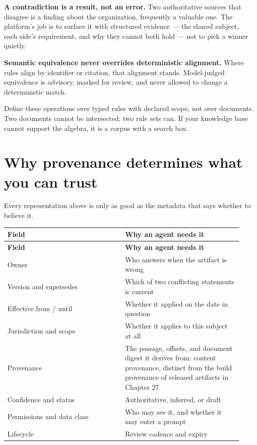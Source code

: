 \textbf{A contradiction is a result, not an error.} Two authoritative sources that disagree is a finding about the organization, frequently a valuable one. The platform's job is to surface it with structured evidence — the shared subject, each side's requirement, and why they cannot both hold — not to pick a winner quietly.\par

\textbf{Semantic equivalence never overrides deterministic alignment.} Where rules align by identifier or citation, that alignment stands. Model-judged equivalence is advisory, marked for review, and never allowed to change a deterministic match.\par

\begin{bookarchitecture}
Define these operations over typed rules with declared scope, not over documents. Two documents cannot be intersected; two rule sets can. If your knowledge base cannot support the algebra, it is a corpus with a search box.
\end{bookarchitecture}

\section{Why provenance determines what you can trust}

Every representation above is only as good as the metadata that says whether to believe it.\par

\BookTableStart
\small
\begin{longtable}{@{}Y{0.4700\linewidth}Y{0.4700\linewidth}@{}}
\color{white}\bfseries Field & \color{white}\bfseries Why an agent needs it \\
\endfirsthead
{}
\color{white}\bfseries Field & \color{white}\bfseries Why an agent needs it \\
\endhead
Owner & Who answers when the artifact is wrong \\
Version and supersedes & Which of two conflicting statements is current \\
Effective from / until & Whether it applied on the date in question \\
Jurisdiction and scope & Whether it applies to this subject at all \\
Provenance & The passage, offsets, and document digest it derives from: content provenance, distinct from the build provenance of released artifacts in Chapter 27 \\
Confidence and status & Authoritative, inferred, or draft \\
Permissions and data class & Who may see it, and whether it may enter a prompt \\
Lifecycle & Review cadence and expiry \\
\end{longtable}
\BookTableEnd


